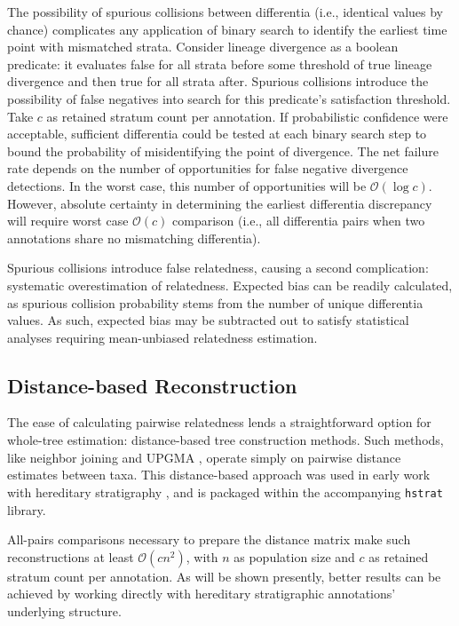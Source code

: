The possibility of spurious collisions between differentia (i.e., identical values by chance) complicates any application of binary search to identify the earliest time point with mismatched strata.
Consider lineage divergence as a boolean predicate: it evaluates false for all strata before some threshold of true lineage divergence and then true for all strata after.
Spurious collisions introduce the possibility of false negatives into search for this predicate's satisfaction threshold.
Take $c$ as retained stratum count per annotation.
If probabilistic confidence were acceptable, sufficient differentia could be tested at each binary search step to bound the probability of misidentifying the point of divergence.
The net failure rate depends on the number of opportunities for false negative divergence detections.
In the worst case, this number of opportunities will be $\mathcal{O}(\log c)$.
However, absolute certainty in determining the earliest differentia discrepancy will require worst case $\mathcal{O}(c)$ comparison (i.e., all differentia pairs when two annotations share no mismatching differentia).

Spurious collisions introduce false relatedness, causing a second complication: systematic overestimation of relatedness.
Expected bias can be readily calculated, as spurious collision probability stems from the number of unique differentia values.
As such, expected bias may be subtracted out to satisfy statistical analyses requiring mean-unbiased relatedness estimation.

\subsection{Distance-based Reconstruction}
\label{sec:distance-based-reconstruction}

The ease of calculating pairwise relatedness lends a straightforward option for whole-tree estimation: distance-based tree construction methods.
Such methods, like neighbor joining and UPGMA \citep{peng2007distance}, operate simply on pairwise distance estimates between taxa.
This distance-based approach was used in early work with hereditary stratigraphy \citep{moreno2022hereditary}, and is packaged within the accompanying \texttt{hstrat} library.

All-pairs comparisons necessary to prepare the distance matrix make such reconstructions at least $\mathcal{O}(c n^2)$, with $n$ as population size and $c$ as retained stratum count per annotation.
As will be shown presently, better results can be achieved by working directly with hereditary stratigraphic annotations' underlying structure.

